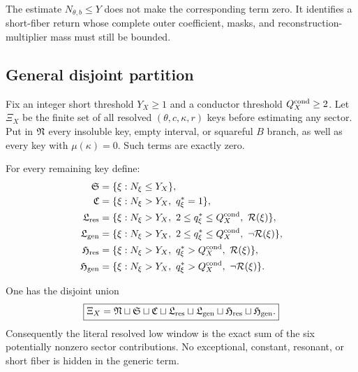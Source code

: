 \begin{remark}
The estimate \(N_{\theta,b}\le Y\) does not make the corresponding
term zero.  It identifies a short-fiber return whose complete outer
coefficient, masks, and reconstruction-multiplier mass must still be
bounded.
\end{remark}

\subsection{General disjoint partition}

Fix an integer short threshold \(Y_X\ge1\) and a conductor threshold
\(Q_X^{\rm cond}\ge2\).  Let \(\Xi_X\) be the finite set of all
resolved \((\theta,c,\kappa,r)\) keys before estimating any sector.
Put in \(\mathfrak N\) every insoluble key, empty interval, or squareful
\(B\) branch, as well as every key with \(\mu(\kappa)=0\).  Such
terms are exactly zero.

For every remaining key define:
\begin{align*}
 \mathfrak S
 &=
 \{\xi:N_\xi\le Y_X\},\\
 \mathfrak C
 &=
 \{\xi:N_\xi>Y_X,\ q_\xi^\ast=1\},\\
 \mathfrak L_{\rm res}
 &=
 \{\xi:N_\xi>Y_X,\ 2\le q_\xi^\ast\le Q_X^{\rm cond},
              \ \mathcal R(\xi)\},\\
 \mathfrak L_{\rm gen}
 &=
 \{\xi:N_\xi>Y_X,\ 2\le q_\xi^\ast\le Q_X^{\rm cond},
              \ \neg\mathcal R(\xi)\},\\
 \mathfrak H_{\rm res}
 &=
 \{\xi:N_\xi>Y_X,\ q_\xi^\ast>Q_X^{\rm cond},
              \ \mathcal R(\xi)\},\\
 \mathfrak H_{\rm gen}
 &=
 \{\xi:N_\xi>Y_X,\ q_\xi^\ast>Q_X^{\rm cond},
              \ \neg\mathcal R(\xi)\}.
\end{align*}

\begin{theorem}
\label{thm:complete-sector-partition}
One has the disjoint union
\begin{equation}
 \boxed{
 \Xi_X
 =
 \mathfrak N\sqcup\mathfrak S\sqcup\mathfrak C
 \sqcup\mathfrak L_{\rm res}\sqcup\mathfrak L_{\rm gen}
 \sqcup\mathfrak H_{\rm res}\sqcup\mathfrak H_{\rm gen}.}
\label{eq:complete-sector-partition}
\end{equation}
Consequently the literal resolved low window is the exact sum of
the six potentially nonzero sector contributions.  No exceptional,
constant, resonant, or short fiber is hidden in the generic term.
\end{theorem}

